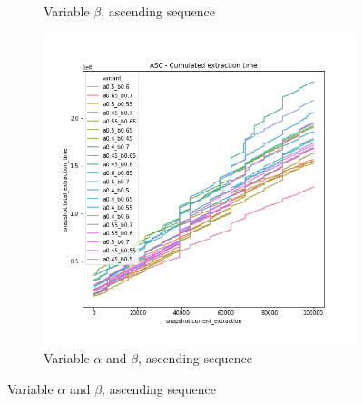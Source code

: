 \begin{figure}
\begin{subfigure}[b]{0.32\textwidth}
        \caption{Variable $\beta$, ascending sequence}
        \label{FIG:05_ALPHABETA_BENCHMARK_ASC_RIGHT}
    \end{subfigure}
    \hfill
    \begin{subfigure}[b]{0.32\textwidth}
        \centering
        \includegraphics[width=\textwidth]{./fragments/04_experimental_execution/images/04_alphabeta_detail_increasing_inner.png.0_0.png}
        \caption{Variable $\alpha$ and $\beta$, ascending sequence}
        \label{FIG:05_ALPHABETA_BENCHMARK_ASC_INNER}
    \end{subfigure}
    \vfill



\end{figure}
